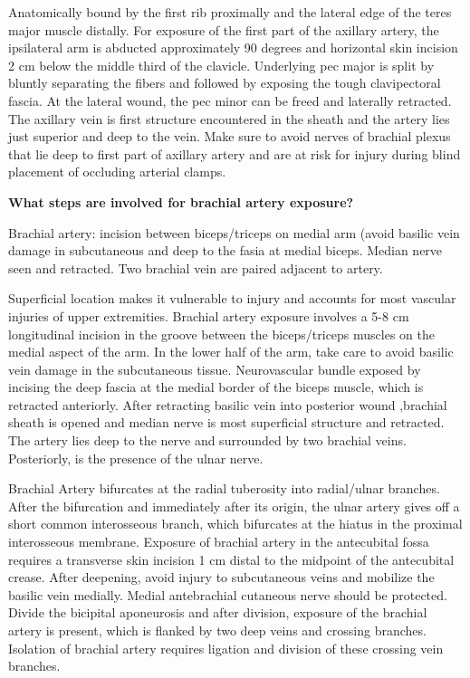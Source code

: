 \documentclass[
]{book}
\begin{document}
Anatomically bound by the first rib proximally and the lateral edge of
the teres major muscle distally. For exposure of the first part of the
axillary artery, the ipsilateral arm is abducted approximately 90
degrees and horizontal skin incision 2 cm below the middle third of the
clavicle. Underlying pec major is split by bluntly separating the fibers
and followed by exposing the tough clavipectoral fascia. At the lateral
wound, the pec minor can be freed and laterally retracted. The axillary
vein is first structure encountered in the sheath and the artery lies
just superior and deep to the vein. Make sure to avoid nerves of
brachial plexus that lie deep to first part of axillary artery and are
at risk for injury during blind placement of occluding arterial clamps.
\citet{garygwindAnatomicExposuresVascular2013}

\textbf{What steps are involved for brachial artery exposure?}

Brachial artery: incision between biceps/triceps on medial arm (avoid
basilic vein damage in subcutaneous and deep to the fasia at medial
biceps. Median nerve seen and retracted. Two brachial vein are paired
adjacent to artery.

Superficial location makes it vulnerable to injury and accounts for most
vascular injuries of upper extremities. Brachial artery exposure
involves a 5-8 cm longitudinal incision in the groove between the
biceps/triceps muscles on the medial aspect of the arm. In the lower
half of the arm, take care to avoid basilic vein damage in the
subcutaneous tissue. Neurovascular bundle exposed by incising the deep
fascia at the medial border of the biceps muscle, which is retracted
anteriorly. After retracting basilic vein into posterior wound ,brachial
sheath is opened and median nerve is most superficial structure and
retracted. The artery lies deep to the nerve and surrounded by two
brachial veins. Posteriorly, is the presence of the ulnar nerve.

Brachial Artery bifurcates at the radial tuberosity into radial/ulnar
branches. After the bifurcation and immediately after its origin, the
ulnar artery gives off a short common interosseous branch, which
bifurcates at the hiatus in the proximal interosseous membrane. Exposure
of brachial artery in the antecubital fossa requires a transverse skin
incision 1 cm distal to the midpoint of the antecubital crease. After
deepening, avoid injury to subcutaneous veins and mobilize the basilic
vein medially. Medial antebrachial cutaneous nerve should be protected.
Divide the bicipital aponeurosis and after division, exposure of the
brachial artery is present, which is flanked by two deep veins and
crossing branches. Isolation of brachial artery requires ligation and
division of these crossing vein branches.
\end{document}
